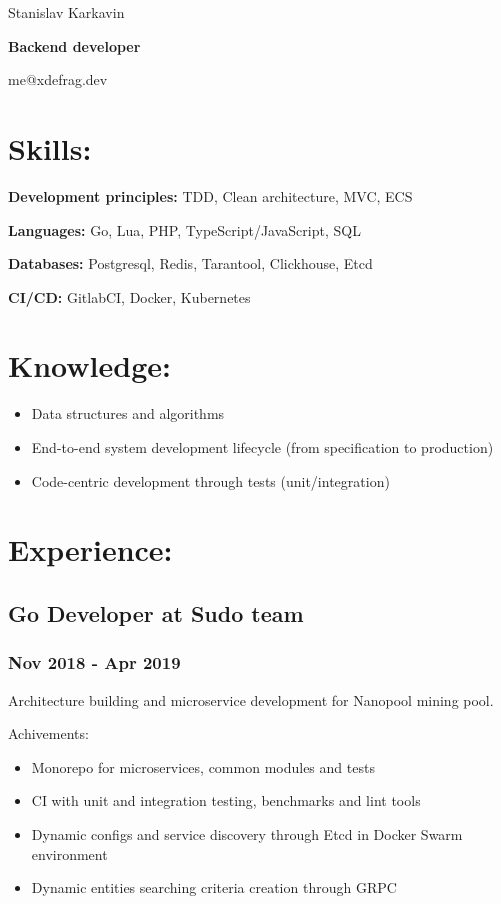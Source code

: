 \documentclass[letterpaper]{article}
\author{Stanislaw Karkavin}
\date{\today}
\title{}
\begin{document}
\begin{center}
Stanislav Karkavin

\textbf{\textbf{Backend developer}}

me@xdefrag.dev
\end{center}

\section{Skills:}
\label{sec:orgb9a9b51}
\textbf{\textbf{Development principles:}} TDD, Clean architecture, MVC, ECS

\textbf{\textbf{Languages:}} Go, Lua, PHP, TypeScript/JavaScript, SQL

\textbf{\textbf{Databases:}} Postgresql, Redis, Tarantool, Clickhouse, Etcd

\textbf{\textbf{CI/CD:}} GitlabCI, Docker, Kubernetes

\section{Knowledge:}
\label{sec:orgd33a6ba}
\begin{itemize}
\item Data structures and algorithms
\item End-to-end system development lifecycle (from specification to production)
\item Code-centric development through tests (unit/integration)
\end{itemize}

\section{Experience:}
\label{sec:org32b8d12}

\subsection{Go Developer at Sudo team}
\label{sec:orgfe74665}
\subsubsection{Nov 2018 - Apr 2019}
\label{sec:orgef48666}
Architecture building and microservice development for Nanopool mining pool.

Achivements:
\begin{itemize}
\item Monorepo for microservices, common modules and tests
\item CI with unit and integration testing, benchmarks and lint tools
\item Dynamic configs and service discovery through Etcd in Docker Swarm environment
\item Dynamic entities searching criteria creation through GRPC
\end{itemize}
\end{document}
